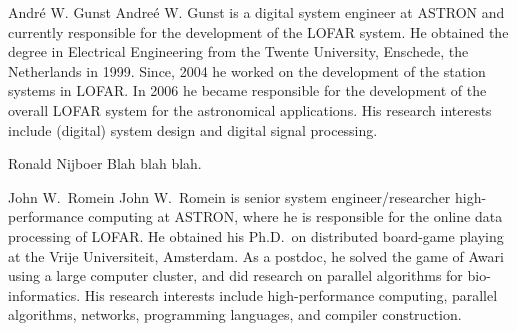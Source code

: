 \documentclass[journal]{IEEEtran}
\begin{document}
\begin{IEEEbiography}{Andr\'{e} W. Gunst}
Andre\'{e} W. Gunst is a digital system engineer at ASTRON and currently responsible for the development of the LOFAR system. He obtained the degree in Electrical Engineering from the Twente University, Enschede, the Netherlands in 1999. Since, 2004 he worked on the development of the station systems in LOFAR. In 2006 he became responsible for the development of the overall LOFAR system for the astronomical applications. His research interests include (digital) system design and digital signal processing.
\end{IEEEbiography}

\begin{IEEEbiography}{Ronald Nijboer}
Blah blah blah.
\end{IEEEbiography}




\begin{IEEEbiography}{John W.\ Romein}
John W.\ Romein is senior system engineer/researcher high-performance
computing at ASTRON, where he is responsible for the online data processing
of LOFAR.
He obtained his Ph.D.\ on distributed board-game playing at the Vrije
Universiteit, Amsterdam.
As a postdoc, he solved the game of Awari using a large computer cluster,
and did research on parallel algorithms for bio-informatics.
His research interests include high-performance computing, parallel algorithms,
networks, programming languages, and compiler construction.
\end{IEEEbiography}






\end{document}
